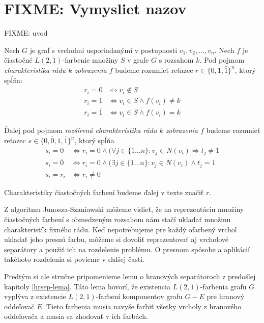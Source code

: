 \chapter{FIXME: Vymysliet nazov}

FIXME: uvod

\begin{defn}
    Nech $G$ je graf s vrcholmi usporiadanými v postupnosti $v_1,v_2, \ldots, v_n$.
    Nech $f$ je čiastočné $L(2,1)$-farbenie množiny $S$ v grafe $G$ s rozsahom $k$. Pod pojmom \emph{charakteristika rádu $k$
    zobrazenia $f$} budeme rozumieť reťazec $r \in \{0, 1, \bar{1}\}^n$, ktorý spĺňa:
    \begin{align*}
        r_i = 0 & \Leftrightarrow v_i \notin S \\
        r_i = 1 & \Leftrightarrow v_i \in S \wedge f(v_i) \neq k \\
        r_i = \bar{1} & \Leftrightarrow v_i \in S \wedge f(v_i) = k
    \end{align*}

    Ďalej pod pojmom \emph{rozšírená charakteristika rádu $k$ zobrazenia $f$} budeme rozumieť reťazec
    $s \in \{0, \bar{0}, 1, \bar{1}\}^n$, ktorý spĺňa
    \begin{align*}
        s_i = 0 & \Leftrightarrow r_i = 0 \wedge (\forall j \in \{1 \dots n\}: v_j \in N(v_i) \Rightarrow t_j \neq 1 \\
        s_i = \bar{0} & \Leftrightarrow r_i = 0 \wedge (\exists j \in \{1 \dots n\}: v_j \in N(v_i) \wedge t_j = 1 \\
        s_i = r_i & \Leftrightarrow r_i \neq 0
    \end{align*}

    Charakteristiky čiastočných farbení budeme ďalej v texte značiť $r$.
\end{defn}

Z algoritmu Junosza-Szaniawski môžeme vidieť, že na reprezentáciu množiny čiastočných farbení
s obmedzeným rozsahom nám stačí ukladať množinu charakteristík fixného rádu. Keď nepotrebujeme
pre každý ofarbený vrchol ukladať jeho presnú farbu, môžeme si dovoliť reprezentovať aj
vrcholové separátory a použiť ich na rozdelenie problému. O presnom spôsobe a aplikácií
takéhoto rozdelenia si povieme v ďalšej časti.

Predtým si ale stručne pripomenieme lemu o hranových separátoroch z predošlej kapitoly \ref{hrsep-lema}.
Táto lema hovorí, že existencia $L(2,1)$-farbenia grafu $G$ vyplýva z existencie $L(2,1)$-farbení
komponentov grafu $G-E$ pre hranový oddeľovač $E$. Tieto farbenia musia navyše farbiť všetky vrcholy
z hranového oddeľovača a musia sa zhodovať v ich farbách.

